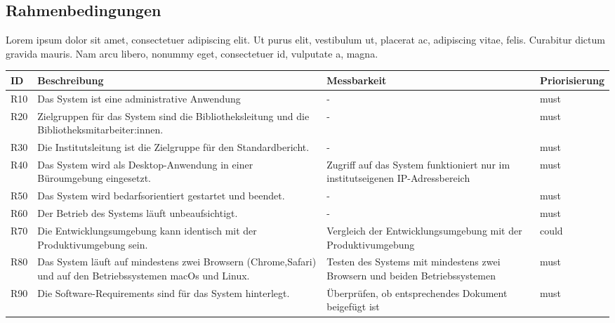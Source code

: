 \subsection{Rahmenbedingungen}
Lorem ipsum dolor sit amet, consectetuer adipiscing elit. Ut purus elit, vestibulum ut, 
placerat ac, adipiscing vitae, felis. Curabitur dictum gravida mauris. Nam arcu libero, nonummy eget, consectetuer id, vulputate a, magna.
\begingroup
\setlength{\tabcolsep}{12pt} %
\renewcommand{\arraystretch}{1.5} 
\begin{table}[H]
    \centering
    \begin{adjustbox}{max width=\textwidth}
    \begin{tabular}{lp{6.5cm}p{6.5cm}l}
       \toprule
       \textbf{ID}          & \textbf{Beschreibung} & \textbf{Messbarkeit} & \textbf{Priorisierung}\\
       \midrule
        R10                               &Das System ist eine administrative Anwendung & -  & must\\
        R20                               &Zielgruppen für das System sind die Bibliotheksleitung und die Bibliotheksmitarbeiter:innen. & -  & must\\
        R30                               &Die Institutsleitung ist die Zielgruppe für den Standardbericht. & -  & must\\
        R40                               &Das System wird als Desktop-Anwendung in einer Büroumgebung eingesetzt. & Zugriff auf das System funktioniert nur im institutseigenen IP-Adressbereich & must\\
        R50                               &Das System wird bedarfsorientiert gestartet und beendet. & -  & must\\
        R60                               &Der Betrieb des Systems läuft unbeaufsichtigt. & -  & must\\
        R70                               &Die Entwicklungsumgebung kann identisch mit der Produktivumgebung sein. & Vergleich der Entwicklungsumgebung mit der Produktivumgebung  & could\\
        R80                               &Das System läuft auf mindestens zwei Browsern (Chrome,Safari) und auf den Betriebssystemen macOs und Linux. & Testen des Systems mit mindestens zwei Browsern und beiden Betriebssystemen  & must\\
        R90                               &Die Software-Requirements sind für das System hinterlegt. & Überprüfen, ob entsprechendes Dokument beigefügt ist  & must\\

\end{tabular}
\end{adjustbox}
\end{table}
